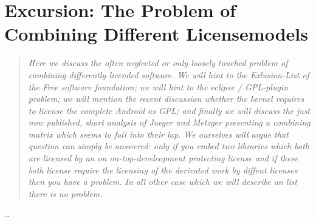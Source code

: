 %
%
%
%
%



\section{Excursion: The Problem of Combining Different Licensemodels}
\footnotesize
\begin{quote}\itshape
Here we discuss the often neglected or only loosely touched problem of combining
differently licended software. We will hint to the Exlusion-List of the Free
software foundation; we will hint to the eclipse / GPL-plugin problem; we will
mention the recent discussion whether the kernel requires to license the
complete Android as GPL; and finally we will discuss the just now published, short
analysis of Jaeger and Metzger presenting a combining matrix which seems to fall
into their lap. We ourselves will argue that question can simply be answered:
only if you embed two libraries which both are licensed by an on
on-top-develeopment protecting license and if these both license require the
licensing of the derivated work by diffent licenses then you have a problem. In
all other case which we will describe an list there is no problem.
\end{quote}
\normalsize
\ldots

%
